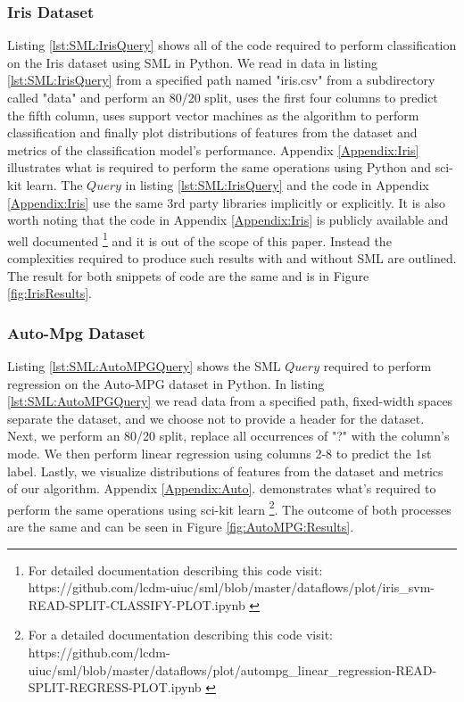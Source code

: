 \subsubsection{Iris Dataset}
Listing \ref{lst:SML:IrisQuery} shows all of the code required to perform classification on the Iris dataset using SML in Python.  We read in data in listing \ref{lst:SML:IrisQuery} from a specified path named "iris.csv" from a subdirectory called "data" and perform an 80/20 split, uses the first four columns to predict the fifth column, uses support vector machines as the algorithm to perform classification and finally plot distributions of features from the dataset and metrics of the classification model's performance.  Appendix \ref{Appendix:Iris} illustrates what is required to perform the same operations using Python and sci-kit learn.  The \(Query\) in listing \ref{lst:SML:IrisQuery} and the code in Appendix \ref{Appendix:Iris} use the same 3rd party libraries implicitly or explicitly.  It is also worth noting that the code in Appendix \ref{Appendix:Iris} is publicly available and well documented \footnote{For detailed documentation describing this code visit: https://github.com/lcdm-uiuc/sml/blob/master/dataflows/plot/iris\_svm-READ-SPLIT-CLASSIFY-PLOT.ipynb \label{lab:iris:git}} and it is out of the scope of this paper.  Instead the complexities required to produce such results with and without SML are outlined.  The result for both snippets of code are the same and is in Figure \ref{fig:IrisResults}.

\subsubsection{Auto-Mpg Dataset}
Listing  \ref{lst:SML:AutoMPGQuery} shows the SML \(Query\) required to perform regression on the Auto-MPG dataset in Python.  In listing \ref{lst:SML:AutoMPGQuery} we read data from a specified path, fixed-width spaces separate the dataset, and we choose not to provide a header for the dataset.  Next, we perform an 80/20 split, replace all occurrences of "?" with the column's mode. We then perform linear regression using columns 2-8 to predict the 1st label. Lastly, we visualize distributions of features from the dataset and metrics of our algorithm.  Appendix \ref{Appendix:Auto}.  demonstrates what's required to perform the same operations using sci-kit learn \footnote{For a detailed documentation describing this code visit: https://github.com/lcdm-uiuc/sml/blob/master/dataflows/plot/autompg\_linear\_regression-READ-SPLIT-REGRESS-PLOT.ipynb \label{lab:SML:AUTO}}. The outcome of both processes are the same and can be seen in Figure \ref{fig:AutoMPG:Results}.

